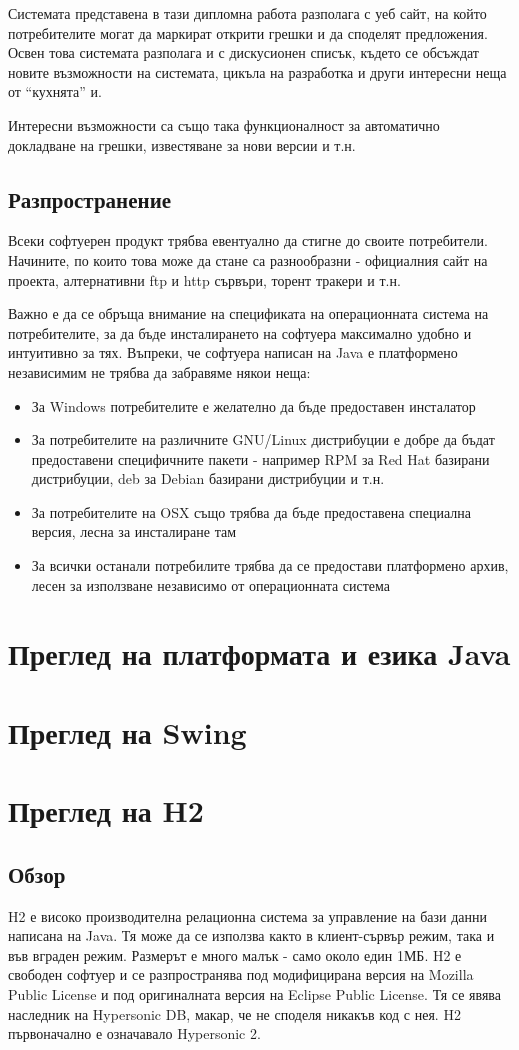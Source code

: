 Системата представена в тази дипломна работа разполага с уеб сайт, на
който потребителите могат да маркират открити грешки и да споделят
предложения. Освен това системата разполага и с дискусионен списък,
където се обсъждат новите възможности на системата, цикъла на
разработка и други интересни неща от "`кухнята"' и. 

Интересни възможности са също така функционалност за автоматично
докладване на грешки, известяване за нови версии и т.н.
\subsection{Разпространение}
Всеки софтуерен продукт трябва евентуално да стигне до своите
потребители. Начините, по които това може да стане са разнообразни -
официалния сайт на проекта, алтернативни ftp и http сървъри, торент
тракери и т.н. 

Важно е да се обръща внимание на спецификата на операционната система
на потребителите, за да бъде инсталирането на софтуера максимално
удобно и интуитивно за тях. Въпреки, че софтуера написан на Java е
платформено независимим не трябва да забравяме някои неща:
\begin{itemize}
  \item За Windows потребителите е желателно да бъде предоставен
  инсталатор
  \item За потребителите на различните GNU/Linux дистрибуции е добре
    да бъдат предоставени специфичните пакети - например RPM за Red
    Hat базирани дистрибуции, deb за Debian базирани дистрибуции и
    т.н.
  \item За потребителите на OSX също трябва да бъде предоставена
    специална версия, лесна за инсталиране там
  \item За всички останали потребилите трябва да се предостави
    платформено архив, лесен за използване независимо от операционната система 
\end{itemize}
\section{Преглед на платформата и езика Java}
\section{Преглед на Swing}
\section{Преглед на H2}
\subsection{Обзор}
H2 е високо производителна релационна система за управление на бази
данни написана на Java. Тя може да се използва както в клиент-сървър
режим, така и във вграден режим. Размерът е много малък - само около
един 1МБ. H2 е свободен софтуер и се разпространява под модифицирана
версия на Mozilla Public License и под оригиналната версия на Eclipse
Public License. Тя се явява наследник на Hypersonic DB, макар, че не
споделя никакъв код с нея. H2 първоначално е означавало Hypersonic 2.

